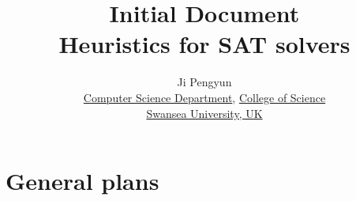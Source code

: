 \documentclass{report}
\begin{document}
	
	\title{Initial Document\\Heuristics for SAT solvers}
	\author{Ji Pengyun\\
		\href{http://www.swan.ac.uk/compsci/}{Computer Science Department}, \href{http://www.swan.ac.uk/science/}{College of Science}\\
		\href{http://www.swan.ac.uk/}{Swansea University, UK}\\
	}
	
	\maketitle
	
	\tableofcontents
	
	\chapter{General plans}
	\label{cha:Generalpreparations}
	
\end{document}
